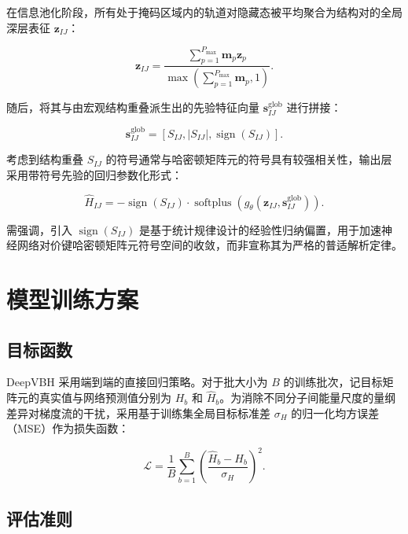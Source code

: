 在信息池化阶段，所有处于掩码区域内的轨道对隐藏态被平均聚合为结构对的全局深层表征 $\mathbf{z}_{IJ}$：

\begin{equation}
\mathbf{z}_{IJ} = \frac{\sum_{p=1}^{P_{\max}} \mathbf{m}_p \mathbf{z}_p}{\max\!\left(\sum_{p=1}^{P_{\max}} \mathbf{m}_p, 1\right)}.
\end{equation}

随后，将其与由宏观结构重叠派生出的先验特征向量 $\mathbf{s}_{IJ}^{\mathrm{glob}}$ 进行拼接：

\begin{equation}
\mathbf{s}_{IJ}^{\mathrm{glob}} = [S_{IJ}, \lvert S_{IJ} \rvert, \operatorname{sign}(S_{IJ})].
\end{equation}

考虑到结构重叠 $S_{IJ}$ 的符号通常与哈密顿矩阵元的符号具有较强相关性，输出层采用带符号先验的回归参数化形式：

\begin{equation}
\hat{H}_{IJ} = -\operatorname{sign}(S_{IJ}) \cdot \operatorname{softplus}\!\left(g_{\theta}(\mathbf{z}_{IJ}, \mathbf{s}_{IJ}^{\mathrm{glob}})\right).
\end{equation}

需强调，引入 $\operatorname{sign}(S_{IJ})$ 是基于统计规律设计的经验性归纳偏置，用于加速神经网络对价键哈密顿矩阵元符号空间的收敛，而非宣称其为严格的普适解析定律。

\section{模型训练方案}

\subsection{目标函数}

DeepVBH 采用端到端的直接回归策略。对于批大小为 $B$ 的训练批次，记目标矩阵元的真实值与网络预测值分别为 $H_b$ 和 $\hat{H}_b$。为消除不同分子间能量尺度的量纲差异对梯度流的干扰，采用基于训练集全局目标标准差 $\sigma_H$ 的归一化均方误差（MSE）作为损失函数：

\begin{equation}
\mathcal{L} = \frac{1}{B}\sum_{b=1}^{B}\left(\frac{\hat{H}_b - H_b}{\sigma_H}\right)^2.
\end{equation}

\subsection{评估准则}

